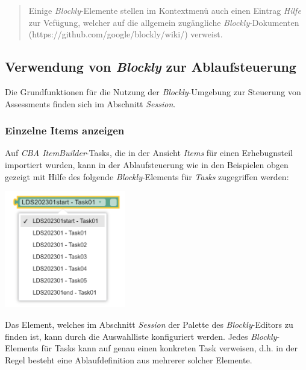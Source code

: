 \documentclass[
  letterpaper,
  DIV=11]{scrreprt}
\begin{document}
\begin{tcolorbox}
\begin{quote}
Einige \emph{Blockly}-Elemente stellen im Kontextmenü auch einen Eintrag
\emph{Hilfe} zur Vefügung, welcher auf die allgemein zugängliche
\emph{Blockly}-Dokumenten (https://github.com/google/blockly/wiki/)
verweist.
\end{quote}

\hypertarget{verwendung-von-blockly-zur-ablaufsteuerung-1}{%
\subsection{\texorpdfstring{Verwendung von \emph{Blockly} zur
Ablaufsteuerung}{Verwendung von Blockly zur Ablaufsteuerung}}\label{verwendung-von-blockly-zur-ablaufsteuerung-1}}

Die Grundfunktionen für die Nutzung der \emph{Blockly}-Umgebung zur
Steuerung von Assessments finden sich im Abschnitt \emph{Session}.

\hypertarget{einzelne-items-anzeigen-1}{%
\subsubsection{Einzelne Items
anzeigen}\label{einzelne-items-anzeigen-1}}

Auf \emph{CBA ItemBuilder}-Tasks, die in der Ansicht \emph{Items} für
einen Erhebugnsteil importiert wurden, kann in der Ablaufsteuerung wie
in den Beispielen obgen gezeigt mit Hilfe des folgende
\emph{Blockly}-Elements für \emph{Tasks} zugegriffen werden:

\includegraphics[width=2.08333in,height=\textheight]{img/screenshot-item-element-lds2003-01-selector.png}

Das Element, welches im Abschnitt \emph{Session} der Palette des
\emph{Blockly}-Editors zu finden ist, kann durch die Auswahlliste
konfiguriert werden. Jedes \emph{Blockly}-Elements für Tasks kann auf
genau einen konkreten Task verweisen, d.h. in der Regel besteht eine
Ablaufdefinition aus mehrerer solcher Elemente.


\end{tcolorbox}
\end{document}
